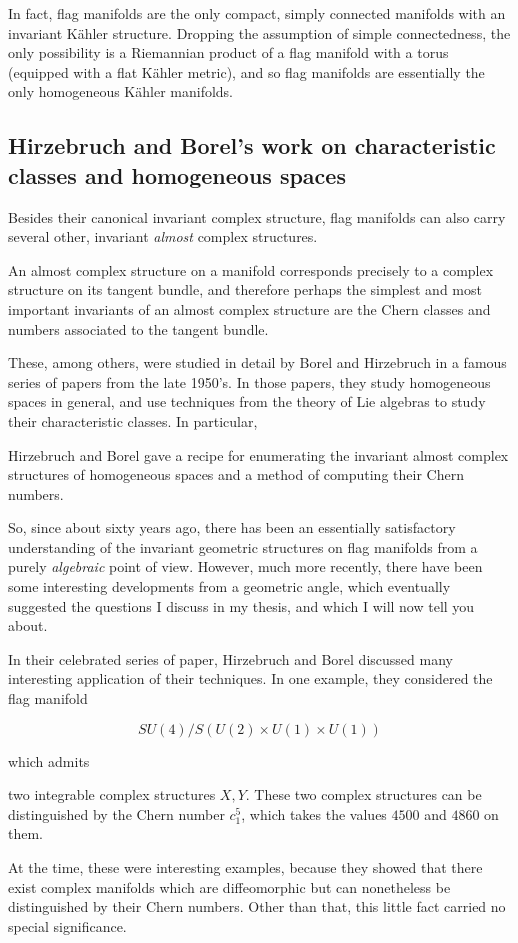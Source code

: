 \documentclass[parskip=half]{scrartcl}
\begin{document}
In fact, flag manifolds are the only compact, simply connected manifolds with an invariant K\"ahler structure. Dropping the assumption of simple connectedness, the only possibility is a Riemannian product of a flag manifold with a torus (equipped with a flat K\"ahler metric), and so flag manifolds are essentially the only homogeneous K\"ahler manifolds.

\subsection{Hirzebruch and Borel's work on characteristic classes and homogeneous spaces}

\begin{onboard}
	Besides their canonical invariant complex structure, flag manifolds can also carry several other, invariant \emph{almost} complex structures.
\end{onboard} 
An almost complex structure on a manifold corresponds precisely to a complex structure on its tangent bundle, and therefore perhaps the simplest and most important invariants of an almost complex structure are the Chern classes and numbers associated to the tangent bundle.

These, among others, were studied in detail by Borel and Hirzebruch in a famous series of papers from the late 1950's. In those papers, they study homogeneous spaces in general, and use techniques from the theory of Lie algebras to study their characteristic classes. In particular, 
\begin{onboard}
	Hirzebruch and Borel gave a recipe for enumerating the invariant almost complex structures of homogeneous spaces and a method of computing their Chern numbers.
\end{onboard}

So, since about sixty years ago, there has been an essentially satisfactory understanding of the invariant geometric structures on flag manifolds from a purely \emph{algebraic} point of view. However, much more recently, there have been some interesting developments from a geometric angle, which eventually suggested the questions I discuss in my thesis, and which I will now tell you about.

In their celebrated series of paper, Hirzebruch and Borel discussed many interesting application of their techniques. In one example, they considered the flag manifold
\begin{onboard}
	\begin{equation*}
	SU(4)/S(U(2)\times U(1)\times U(1))
\end{equation*}
\end{onboard}
which admits 
\begin{onboard}
	two integrable complex structures $X,Y$. These two complex structures can be distinguished by the Chern number $c_1^5$, which takes the values $4500$ and $4860$ on them.
\end{onboard} 
At the time, these were interesting examples, because they showed that there exist complex manifolds which are diffeomorphic but can nonetheless be distinguished by their Chern numbers. Other than that, this little fact carried no special significance. 
\end{document}
